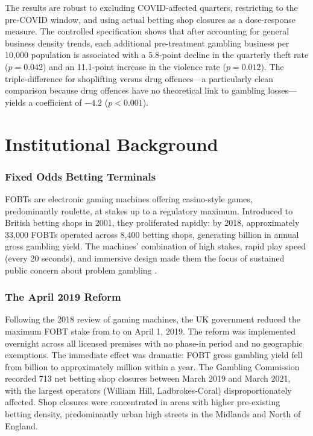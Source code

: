\documentclass[12pt]{article}
\begin{document}
The results are robust to excluding COVID-affected quarters, restricting to the pre-COVID window, and using actual betting shop closures as a dose-response measure. The controlled specification shows that after accounting for general business density trends, each additional pre-treatment gambling business per 10,000 population is associated with a 5.8-point decline in the quarterly theft rate ($p=0.042$) and an 11.1-point increase in the violence rate ($p=0.012$). The triple-difference for shoplifting versus drug offences---a particularly clean comparison because drug offences have no theoretical link to gambling losses---yields a coefficient of $-4.2$ ($p<0.001$).


\section{Institutional Background}

\subsubsection*{Fixed Odds Betting Terminals} FOBTs are electronic gaming machines offering casino-style games, predominantly roulette, at stakes up to a regulatory maximum. Introduced to British betting shops in 2001, they proliferated rapidly: by 2018, approximately 33,000 FOBTs operated across 8,400 betting shops, generating  billion in annual gross gambling yield. The machines' combination of high stakes, rapid play speed (every 20 seconds), and immersive design made them the focus of sustained public concern about problem gambling \citep{wardle2019gambling, rockloff2022machines}.

\subsubsection*{The April 2019 Reform} Following the 2018 review of gaming machines, the UK government reduced the maximum FOBT stake from  to  on April 1, 2019. The reform was implemented overnight across all licensed premises with no phase-in period and no geographic exemptions. The immediate effect was dramatic: FOBT gross gambling yield fell from  billion to approximately  million within a year. The Gambling Commission recorded 713 net betting shop closures between March 2019 and March 2021, with the largest operators (William Hill, Ladbrokes-Coral) disproportionately affected. Shop closures were concentrated in areas with higher pre-existing betting density, predominantly urban high streets in the Midlands and North of England.
\end{document}
